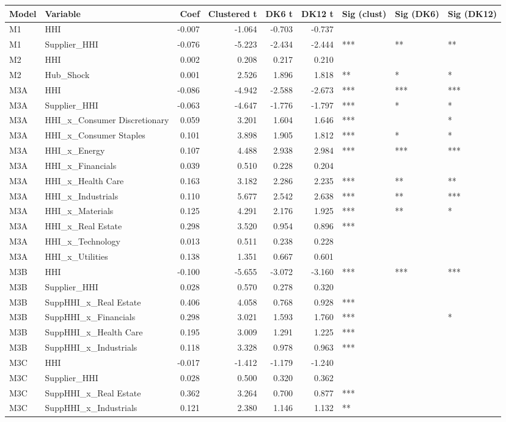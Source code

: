 \begin{tabular}{llrrrrlll}
\toprule
Model & Variable & Coef & Clustered t & DK6 t & DK12 t & Sig (clust) & Sig (DK6) & Sig (DK12) \\
\midrule
M1 & HHI & -0.007 & -1.064 & -0.703 & -0.737 &  &  &  \\
M1 & Supplier_HHI & -0.076 & -5.223 & -2.434 & -2.444 & *** & ** & ** \\
M2 & HHI & 0.002 & 0.208 & 0.217 & 0.210 &  &  &  \\
M2 & Hub_Shock & 0.001 & 2.526 & 1.896 & 1.818 & ** & * & * \\
M3A & HHI & -0.086 & -4.942 & -2.588 & -2.673 & *** & *** & *** \\
M3A & Supplier_HHI & -0.063 & -4.647 & -1.776 & -1.797 & *** & * & * \\
M3A & HHI_x_Consumer Discretionary & 0.059 & 3.201 & 1.604 & 1.646 & *** &  & * \\
M3A & HHI_x_Consumer Staples & 0.101 & 3.898 & 1.905 & 1.812 & *** & * & * \\
M3A & HHI_x_Energy & 0.107 & 4.488 & 2.938 & 2.984 & *** & *** & *** \\
M3A & HHI_x_Financials & 0.039 & 0.510 & 0.228 & 0.204 &  &  &  \\
M3A & HHI_x_Health Care & 0.163 & 3.182 & 2.286 & 2.235 & *** & ** & ** \\
M3A & HHI_x_Industrials & 0.110 & 5.677 & 2.542 & 2.638 & *** & ** & *** \\
M3A & HHI_x_Materials & 0.125 & 4.291 & 2.176 & 1.925 & *** & ** & * \\
M3A & HHI_x_Real Estate & 0.298 & 3.520 & 0.954 & 0.896 & *** &  &  \\
M3A & HHI_x_Technology & 0.013 & 0.511 & 0.238 & 0.228 &  &  &  \\
M3A & HHI_x_Utilities & 0.138 & 1.351 & 0.667 & 0.601 &  &  &  \\
M3B & HHI & -0.100 & -5.655 & -3.072 & -3.160 & *** & *** & *** \\
M3B & Supplier_HHI & 0.028 & 0.570 & 0.278 & 0.320 &  &  &  \\
M3B & SuppHHI_x_Real Estate & 0.406 & 4.058 & 0.768 & 0.928 & *** &  &  \\
M3B & SuppHHI_x_Financials & 0.298 & 3.021 & 1.593 & 1.760 & *** &  & * \\
M3B & SuppHHI_x_Health Care & 0.195 & 3.009 & 1.291 & 1.225 & *** &  &  \\
M3B & SuppHHI_x_Industrials & 0.118 & 3.328 & 0.978 & 0.963 & *** &  &  \\
M3C & HHI & -0.017 & -1.412 & -1.179 & -1.240 &  &  &  \\
M3C & Supplier_HHI & 0.028 & 0.500 & 0.320 & 0.362 &  &  &  \\
M3C & SuppHHI_x_Real Estate & 0.362 & 3.264 & 0.700 & 0.877 & *** &  &  \\
M3C & SuppHHI_x_Industrials & 0.121 & 2.380 & 1.146 & 1.132 & ** &  &  \\
\bottomrule
\end{tabular}
